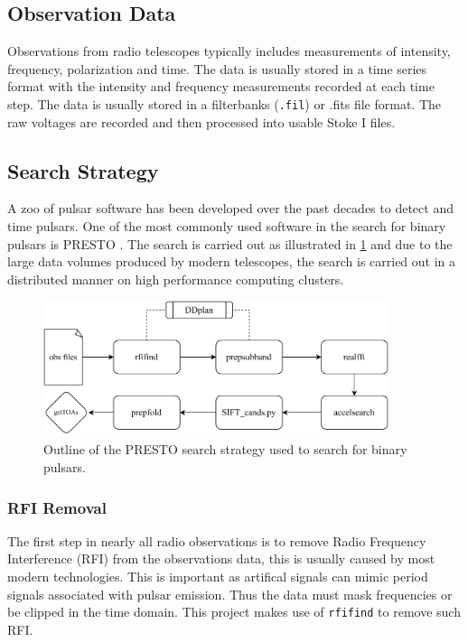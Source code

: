 \subsection{Observation Data} \label{sec:method-observation-data}

Observations from radio telescopes typically includes measurements of intensity, frequency, polarization and time. The data is usually stored in a time series format with the intensity and frequency measurements recorded at each time step. The data is usually stored in a  filterbanks (\texttt{.fil}) or .fits file format. The raw voltages are recorded and then processed into usable Stoke I files. 

\subsection{Search Strategy}

A zoo of pulsar software has been developed over the past decades to detect and time pulsars. One of the most commonly used software in the search for binary pulsars is PRESTO \citep{ransom_new_2001}. The search is carried out as illustrated in \cref{fig: presto-work-flow} and due to the large data volumes produced by modern telescopes, the search is carried out in a distributed manner on high performance computing clusters. \\ 

\begin{figure}[h]
    \centering
    \includegraphics[width = 0.9\textwidth]{figs/presto_pipeline.pdf}
    \caption{Outline of the PRESTO search strategy used to search for binary pulsars.}
    \label{fig: presto-work-flow}
\end{figure}

\subsubsection{RFI Removal}

The first step in nearly all radio observations is to remove Radio Frequency Interference (RFI) from the observations data, this is usually caused by most modern technologies. This is important as artifical signals can mimic period signals associated with pulsar emission. Thus the data must mask frequencies or be clipped in the time domain. This project makes use of \texttt{rfifind} to remove such RFI. 

